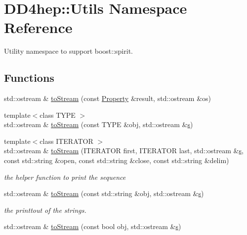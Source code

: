 \hypertarget{namespace_d_d4hep_1_1_utils}{
\section{DD4hep::Utils Namespace Reference}
\label{namespace_d_d4hep_1_1_utils}
}


Utility namespace to support boost::spirit.  
\subsection*{Functions}
\begin{DoxyCompactItemize}
\item 
std::ostream \& \hyperlink{namespace_d_d4hep_1_1_utils_ab016d8d624f13c9f5470910f2057b860}{toStream} (const \hyperlink{class_d_d4hep_1_1_property}{Property} \&result, std::ostream \&os)
\item 
{\footnotesize template$<$class TYPE $>$ }\\std::ostream \& \hyperlink{namespace_d_d4hep_1_1_utils_a99350f29a14b86f5cd3022ee5d699d37}{toStream} (const TYPE \&obj, std::ostream \&\hyperlink{_volumes_8cpp_a17ca6bfc8040d695d3cada22a4763d40}{s})
\item 
{\footnotesize template$<$class ITERATOR $>$ }\\std::ostream \& \hyperlink{namespace_d_d4hep_1_1_utils_a9e8a16588de4a1111974c06684574814}{toStream} (ITERATOR first, ITERATOR last, std::ostream \&\hyperlink{_volumes_8cpp_a17ca6bfc8040d695d3cada22a4763d40}{s}, const std::string \&open, const std::string \&close, const std::string \&delim)
\begin{DoxyCompactList}\small\item\em the helper function to print the sequence \item\end{DoxyCompactList}\item 
std::ostream \& \hyperlink{namespace_d_d4hep_1_1_utils_aa018a120e53fa6edbb44f423a31baa21}{toStream} (const std::string \&obj, std::ostream \&\hyperlink{_volumes_8cpp_a17ca6bfc8040d695d3cada22a4763d40}{s})
\begin{DoxyCompactList}\small\item\em the printtout of the strings. \item\end{DoxyCompactList}\item 
std::ostream \& \hyperlink{namespace_d_d4hep_1_1_utils_a4f1e298302e413af8ba3059d36f85336}{toStream} (const bool obj, std::ostream \&\hyperlink{_volumes_8cpp_a17ca6bfc8040d695d3cada22a4763d40}{s})

\end{DoxyCompactItemize}
